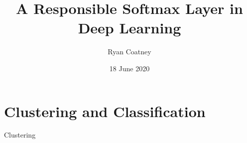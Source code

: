 \documentclass{beamer}
\title[Responsible Softmax]{A Responsible Softmax Layer in Deep Learning}
\author{Ryan Coatney}
\institute{\tiny{University of Arizona}}
\date{18 June 2020}
\begin{document}
	\maketitle
	
	\section{Clustering and Classification}
	\begin{frame}{Clustering}
		\begin{figure}
			\centering
			\begin{subfigure}{.7\linewidth}
				
			\end{subfigure}
			\pause
			\begin{subfigure}{.7\linewidth}
				\ \\
			\end{subfigure}
			\begin{subfigure}{.7\linewidth}
				
			\end{subfigure}
		\end{figure}
	\end{frame}
\end{document}
